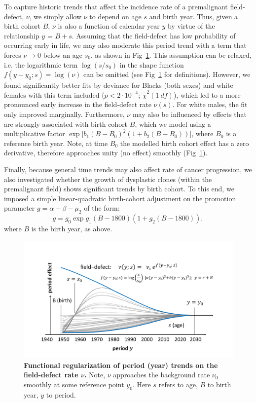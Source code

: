 \documentclass[10pt,letterpaper]{article}
\begin{document}
To capture historic trends that affect the incidence rate of a premalignant field-defect, $\nu$, we simply allow $\nu$ to depend on age $s$ and birth year. Thus, given a birth cohort $B$, $\nu$ is also a function of calendar year $y$ by virtue of the relationship $y$ = $B+s$. Assuming that the field-defect has low probability of occurring early in life, we may also moderate this period trend with a term that forces $\nu \rightarrow 0$ below an age $s_0$, as shown in Fig~\ref{fig2}. This assumption can be relaxed, i.e. the logarithmic term $\log(s/s_0)$ in the shape function $f(y-y_0;s) = \log(\nu)$ can be omitted (see Fig~\ref{fig2} for definitions). However, we found significantly better fits by deviance for Blacks (both sexes) and white females with this term included ($ p < 2\cdot  10^{-4}$; $\tilde{\chi}^2 (1 \ df)$), which led to a more pronounced early increase in the field-defect rate $\nu(s)$. For white males, the fit only improved marginally. Furthermore, $\nu$ may also be influenced by effects that are strongly associated with birth cohort $B$, which we model using a multiplicative factor $\exp \big[b_1 (B-B_0)^2(1+b_2(B-B_0))\big]$, where $B_0$ is a reference birth year. Note, at time $B_0$ the modelled birth cohort effect has a zero derivative, therefore approaches unity (no effect) smoothly (Fig~\ref{fig2}). 

Finally, because general time trends may also affect rate of cancer progression, we also investigated whether the growth of dysplastic clones (within the premalignant field) shows significant trends by birth cohort. To this end, we imposed a simple linear-quadratic birth-cohort adjustment on the promotion parameter $g=\alpha-\beta-\mu_2$ of the form:
$$g=g_0 \exp{g_1(B-1800)(1+g_2(B-1800))},$$
where $B$ is the birth year, as above.  
\medskip
\begin{figure}[!ht]
\begin{adjustwidth}{-1in}{0in} 
\includegraphics[scale=0.5, trim=0 0 0 0]{Fig.2.pdf}
\end{adjustwidth}
\caption{{\bf Functional regularization of period (year) trends on the field-defect rate $\nu$.} Note, $\nu$ approaches the background rate $\nu_0$ smoothly at some reference point $y_0$. Here $s$ refers to age, $B$ to birth year, $y$ to period.}
\label{fig2}
\end{figure}
\end{document}
